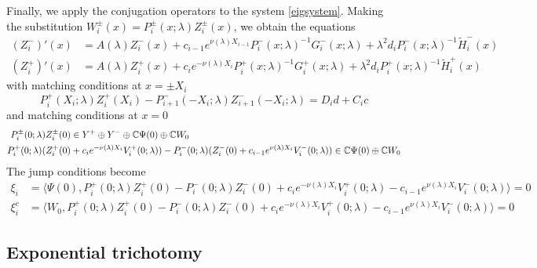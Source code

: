 \documentclass[10pt,reqno]{amsart}
\theoremstyle{plain}
\theoremstyle{definition}
\theoremstyle{remark}
\numberwithin{theorem}{section}
\numberwithin{equation}{section}
\begin{document}
Finally, we apply the conjugation operators to the system \cref{eigsystem}. Making the substitution $W_i^\pm(x) = P_i^\pm(x; \lambda) Z_i^\pm(x)$, we obtain the equations
\begin{equation}\label{systemZ}
\begin{aligned}
(Z_i^-)'(x) &= A(\lambda) Z_i^-(x) + c_{i-1} e^{\nu(\lambda)X_{i-1}}  P_i^-(x; \lambda)^{-1} G_i^-(x; \lambda) + \lambda^2 d_i P_i^-(x; \lambda)^{-1} \tilde{H}_i^-(x) \\
(Z_i^+)'(x) &= A(\lambda) Z_i^+(x) + c_i e^{-\nu(\lambda)X_i}  P_i^+(x; \lambda)^{-1} G_i^+(x; \lambda) + \lambda^2 d_i P_i^+(x; \lambda)^{-1} \tilde{H}_i^+(x)
\end{aligned}
\end{equation}
with matching conditions at $x = \pm X_i$
\begin{equation}\label{systemmiddle}
P_i^+(X_i; \lambda) Z_i^+(X_i) - P_{i+1}^-(-X_i; \lambda) Z_{i+1}^-(-X_i; \lambda) = D_i d + C_i c 
\end{equation}
and matching conditions at $x = 0$
\begin{equation}\label{systemcenter}
\begin{aligned}
P_i^\pm(0; \lambda) Z_i^\pm(0) &\in Y^+ \oplus Y^- \oplus \mathbb{C} \Psi(0) \oplus \mathbb{C} W_0 \\
P_i^+(0; \lambda)(Z_i^+(0) &+ c_i e^{-\nu(\lambda)X_i}V_i^+(0; \lambda)) - P_i^-(0; \lambda) (Z_i^-(0) + c_{i-1} e^{\nu(\lambda)X_i} V_i^-(0; \lambda)) \in \mathbb{C} \Psi(0) \oplus \mathbb{C} W_0
\end{aligned}
\end{equation}
The jump conditions become
\begin{equation}\label{jumpcondZ}
\begin{aligned}
\xi_i &= \langle \Psi(0), P_i^+(0; \lambda) Z_i^+(0) - P_i^-(0; \lambda) Z_i^-(0) + c_i e^{-\nu(\lambda)X_i}V_i^+(0; \lambda) - c_{i-1} e^{\nu(\lambda)X_i} V_i^-(0; \lambda) \rangle = 0  \\
\xi_i^c &= \langle W_0, P_i^+(0; \lambda) Z_i^+(0) - P_i^-(0; \lambda) Z_i^-(0) + c_i e^{-\nu(\lambda)X_i}V_i^+(0; \lambda) - c_{i-1} e^{\nu(\lambda)X_i} V_i^-(0; \lambda) \rangle = 0 
\end{aligned}
\end{equation}

\subsection{Exponential trichotomy}\label{sec:trichotomy}
\end{document}
